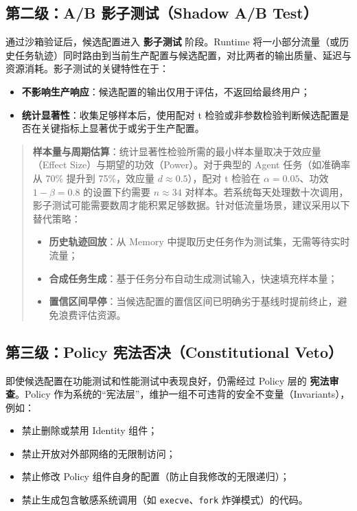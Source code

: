 \subsection{第二级：A/B 影子测试（Shadow A/B Test）}

通过沙箱验证后，候选配置进入 \textbf{影子测试} 阶段。Runtime 将一小部分流量（或历史任务轨迹）同时路由到当前生产配置与候选配置，对比两者的输出质量、延迟与资源消耗。影子测试的关键特性在于：
\begin{itemize}
    \item \textbf{不影响生产响应}：候选配置的输出仅用于评估，不返回给最终用户；
    \item \textbf{统计显著性}：收集足够样本后，使用配对 t 检验或非参数检验判断候选配置是否在关键指标上显著优于或劣于生产配置。
\end{itemize}

\begin{quote}
\textbf{样本量与周期估算}：统计显著性检验所需的最小样本量取决于效应量（Effect Size）与期望的功效（Power）。对于典型的 Agent 任务（如准确率从 70\% 提升到 75\%，效应量 $d \approx 0.5$），配对 t 检验在 $\alpha=0.05$、功效 $1-\beta=0.8$ 的设置下约需要 $n \approx 34$ 对样本。若系统每天处理数十次调用，影子测试可能需要数周才能积累足够数据。针对低流量场景，建议采用以下替代策略：
\begin{itemize}
    \item \textbf{历史轨迹回放}：从 Memory 中提取历史任务作为测试集，无需等待实时流量；
    \item \textbf{合成任务生成}：基于任务分布自动生成测试输入，快速填充样本量；
    \item \textbf{置信区间早停}：当候选配置的置信区间已明确劣于基线时提前终止，避免浪费评估资源。
\end{itemize}
\end{quote}

\subsection{第三级：Policy 宪法否决（Constitutional Veto）}

即使候选配置在功能测试和性能测试中表现良好，仍需经过 Policy 层的 \textbf{宪法审查}。Policy 作为系统的“宪法层”，维护一组不可违背的安全不变量（Invariants），例如：
\begin{itemize}
    \item 禁止删除或禁用 Identity 组件；
    \item 禁止开放对外部网络的无限制访问；
    \item 禁止修改 Policy 组件自身的配置（防止自我修改的无限递归）；
    \item 禁止生成包含敏感系统调用（如 \texttt{execve}、\texttt{fork} 炸弹模式）的代码。
\end{itemize}

